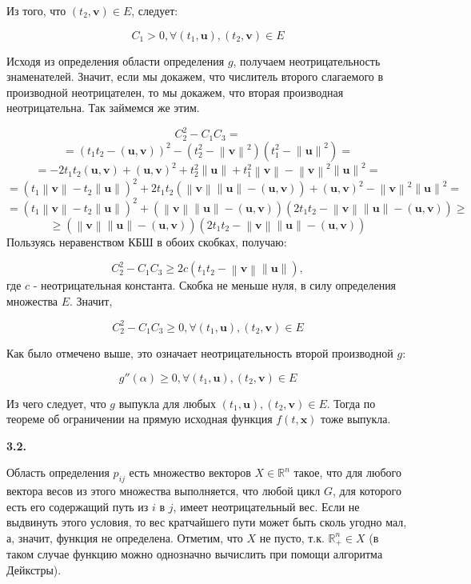 \documentclass[12pt]{article}
\newcommand\norm[1]{\left\lVert#1\right\rVert}
\begin{document}
Из того, что $(t_2, \textbf{v}) \in E$, следует:

$$C_1 > 0, \forall (t_1, \textbf{u}), (t_2, \textbf{v}) \in E$$

Исходя из  определения области определения $g$, получаем неотрицательность знаменателей. Значит, если мы докажем, что числитель второго слагаемого в производной неотрицателен, то мы докажем, что вторая производная неотрицательна. Так займемся же этим.

$$C_2^2-C_1C_3=$$
$$= (t_1t_2 - (\textbf{u},\textbf{v}))^2 - (t_2^2 - \norm{\textbf{v}}^2)(t_1^2 - \norm{\textbf{u}}^2)=$$
$$=-2t_1t_2(\textbf{u},\textbf{v}) + (\textbf{u},\textbf{v})^2 + t_2^2\norm{\textbf{u}} + t_1^2\norm{\textbf{v}} -\norm{\textbf{v}}^2\norm{\textbf{u}}^2=$$
$$=(t_1\norm{\textbf{v}} - t_2\norm{\textbf{u}})^2+2t_1t_2(\norm{\textbf{v}}\norm{\textbf{u}}-(\textbf{u},\textbf{v})) + (\textbf{u},\textbf{v})^2 -\norm{\textbf{v}}^2\norm{\textbf{u}}^2=$$
$$=(t_1\norm{\textbf{v}} - t_2\norm{\textbf{u}})^2 + (\norm{\textbf{v}}\norm{\textbf{u}}-(\textbf{u},\textbf{v}))(2t_1t_2 - \norm{\textbf{v}}\norm{\textbf{u}}-(\textbf{u},\textbf{v}))\geq$$
$$\geq (\norm{\textbf{v}}\norm{\textbf{u}}-(\textbf{u},\textbf{v}))(2t_1t_2 - \norm{\textbf{v}}\norm{\textbf{u}}-(\textbf{u},\textbf{v}))$$
Пользуясь неравенством КБШ в обоих скобках, получаю:

$$C_2^2-C_1C_3 \geq 2c(t_1t_2 - \norm{\textbf{v}}\norm{\textbf{u}}),$$
где $c$ - неотрицательная константа. Скобка не меньше нуля, в силу определения множества $E$. Значит,

$$C_2^2-C_1C_3 \geq 0, \forall (t_1, \textbf{u}), (t_2, \textbf{v}) \in E$$

Как было отмечено выше, это означает неотрицательность второй производной $g$:

$$g''(\alpha) \geq 0, \forall (t_1, \textbf{u}), (t_2, \textbf{v}) \in E$$

Из чего следует, что $g$ выпукла для любых $(t_1, \textbf{u}), (t_2, \textbf{v}) \in E$. Тогда по теореме об ограничении на прямую исходная функция $f(t, \textbf{x})$ тоже выпукла.

\begin{center}
	\textbf{3.2.}
\end{center}

Область определения $p_{ij}$ есть множество векторов $X \in \mathbb{R}^n$ такое, что для любого вектора весов из этого множества выполняется, что любой цикл $G$, для которого есть его содержащий путь из $i$ в $j$, имеет неотрицательный вес. Если не выдвинуть этого условия, то вес кратчайшего пути может быть сколь угодно мал, а, значит,
 функция не определена. Отметим, что $X$ не пусто, т.к. $\mathbb{R}^n_+\in X$ (в таком случае функцию можно однозначно вычислить при помощи алгоритма Дейкстры).
 
\end{document}

